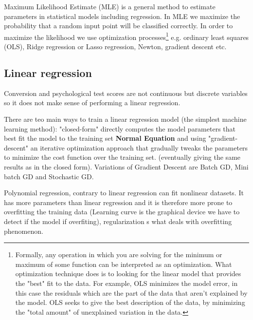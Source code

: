 \documentclass[11pt]{article}
\begin{document}
Maximum Likelihood Estimate (MLE) is a general method to estimate parameters in statistical models including regression. In MLE we maximize the probability that a random input point will be classified correctly. In order to maximize the likelihood we use optimization processes\footnote{Formally, any operation in which you are solving for the minimum or maximum of some function can be interpreted as an optimization. What optimization technique does is to looking for the linear model that provides the "best" fit to the data. For example, OLS minimizes the model error, in this case the residuals which are the part of the data that aren't explained by the model. OLS seeks to give the best description of the data, by minimizing the "total amount" of unexplained variation in the data.} e.g. ordinary least squares (OLS), Ridge regression or Lasso regression, Newton, gradient descent etc. 

\subsection{Linear regression}
Conversion and psychological test scores are not continuous but discrete variables so it does not make sense of performing a linear regression.

There are teo main ways to train a linear regression model (the simplest machine learning method): "closed-form" directly computes the model parameters that best fit the model to the training set \textbf{Normal Equation} and using "gradient-descent" an iterative optimization approach that gradually tweaks the parameters to minimize the cost function over the training set. (eventually giving the same results as in the closed form). Variations of Gradient Descent are Batch GD, Mini batch GD and Stochastic GD.

Polynomial regression, contrary to linear regression can fit nonlinear datasets. It has more parameters than linear regression and it is therefore more prone to overfitting the training data (Learning curve is the graphical device we have to detect if the model if overfiting), regularization s what deals with overfitting phenomenon.
\end{document}
